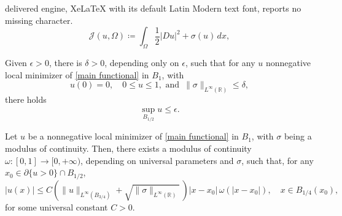 \documentclass[10pt,a4paper]{amsart}
\begin{document}
delivered engine, XeLaTeX with its default Latin Modern text font, reports no missing character.
\begin{equation}\label{main functional}
\mathcal{J}(u,\Omega) \coloneqq \int_{\Omega} \frac{1}{2}|Du|^2 + \sigma(u)\,dx,
\end{equation}

\begin{lemma}\label{flat lemma}
Given $\epsilon > 0$, there is $\delta>0$, depending only on $\epsilon$, such that for any $u$ nonnegative local minimizer of \eqref{main functional} in $B_1$, with 
$$
   u(0) = 0, \quad 0 \leq u \leq 1, \text{ and }\, \|\sigma\|_{L^\infty(\mathbb{R})} \leq \delta,
$$
there holds
$$
    \sup_{B_{1/2}} u \leq \epsilon.
$$
\end{lemma}

\begin{theorem}\label{C1 regularity at free boundary}
Let $u$ be a nonnegative local minimizer of \eqref{main functional} in $B_1$, with $\sigma$ being a modulus of continuity. Then, there exists a modulus of continuity $\omega \colon [0,1] \to [0,+\infty)$, depending on universal parameters and $\sigma$, such that, for any $x_0 \in \partial \{u>0\}\cap B_{1/2}$, 
$$
    |u(x)| \leq C\left(\|u\|_{L^\infty(B_{3/4})} + \sqrt{\|\sigma\|_{L^\infty(\mathbb{R})}} \, \right)|x-x_0|\,\omega(|x-x_0|), \quad x \in B_{1/4}(x_0),
$$
for some universal constant $C>0$.
\end{theorem}
\end{document}
